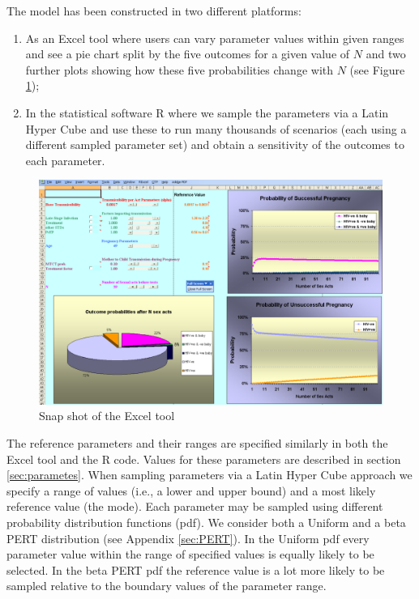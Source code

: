 \documentclass[11pt]{nih_mod}
\begin{document}
The model has been constructed in two different platforms: 
\begin{enumerate}
	\item As an Excel tool where users can vary parameter values within given ranges and see a pie chart split by the five outcomes for a given value of $N$ and two further plots showing how these five probabilities change with $N$ (see Figure \ref{Fig:Exceltool}); 
	\item In the statistical software R where we sample the parameters via a Latin Hyper Cube and use these to run many thousands of scenarios (each using a different sampled parameter set) and obtain a sensitivity of the outcomes to each parameter.
\end{enumerate}
\begin{figure}[!h]
  \begin{center}
    \includegraphics[width=7in]{figures/Exceltool.pdf}
  \end{center}
  \caption{Snap shot of the Excel tool}
  \label{Fig:Exceltool}
\end{figure}
The reference parameters and their ranges are specified similarly in both the Excel tool and the R code. Values for these parameters are described in section \ref{sec:parametes}. When sampling parameters via a Latin Hyper Cube approach we specify a range of values (i.e., a lower and upper bound) and a most likely reference value (the mode). Each parameter may be sampled using different probability distribution functions (pdf). We consider both a Uniform and a beta PERT distribution (see Appendix \ref{sec:PERT}). In the Uniform pdf every parameter value within the range of specified values is equally likely to be selected. In the beta PERT pdf the reference value is a lot more likely to be sampled relative to the boundary values of the parameter range.  
\end{document}
